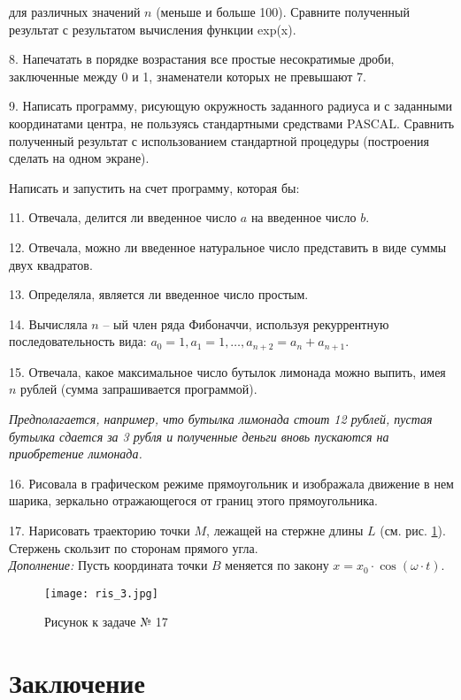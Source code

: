 для различных значений $n$ (меньше и больше 100). Сравните полученный результат с результатом вычисления функции exp(x).


8. Напечатать в порядке возрастания все простые несократимые дроби, заключенные между 0 и 1, знаменатели которых не превышают 7.
    
9. Написать программу, рисующую окружность заданного радиуса и с заданными координатами центра, не пользуясь стандартными средствами PASCAL. Сравнить полученный результат с использованием стандартной процедуры (построения сделать на одном экране).

Написать и запустить на счет программу, которая бы:

11. Отвечала, делится ли введенное число $a$ на введенное число $b$.

12. Отвечала, можно ли введенное натуральное число предста­вить в виде суммы двух квадратов.

13. Определяла, является ли введенное число простым.

14. Вычисляла $n$ -- ый член ряда Фибоначчи, используя рекур­рентную последовательность вида: 
$a_0 = 1, a_1 = 1, \ldots ,a_{n+2} = a_n + a_{n+1}.$

    15. Отвечала, какое максимальное число бутылок лимонада можно выпить, имея $n$ рублей (сумма запрашивается программой).
    
{\it Предполагается, например, что бутылка лимонада стоит 12 рублей, пустая бутылка сдается за 3 рубля и полученные деньги вновь пускаются на приобретение лимонада.}

16.	Рисовала в графическом режиме прямоугольник и изображала движение в нем шарика, зеркально отражающегося от границ этого прямоугольника.

17. Нарисовать траекторию точки $M$, лежащей на стержне длины $L$ (см. рис. \ref{ris4}). Стержень скользит по сторонам прямого угла. \\
{\it Дополнение:} Пусть координата точки $B$  меняется по закону 
$x = x_0\cdot\cos(\omega\cdot t).$
   
\begin{figure}[!hb]
\centerline{
\texttt{[image: ris\_3.jpg]}}
\caption{Рисунок к задаче № 17}
\label{ris4}
\end{figure}
 

\section{Заключение}

